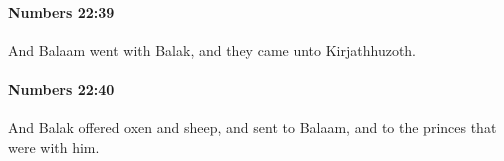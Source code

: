 		\paragraph{Numbers 22:39} %
			\label{NUMBERS-22-39}

			And Balaam went with Balak, and they came unto Kirjathhuzoth.


		\paragraph{Numbers 22:40} %
			\label{NUMBERS-22-40}

			And Balak offered oxen and sheep, and sent to Balaam, and to the princes that were with him.


